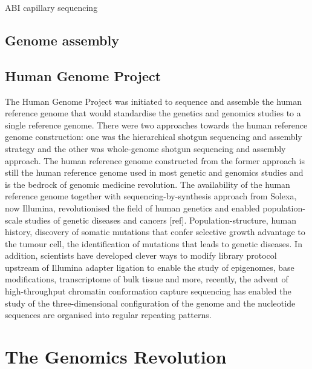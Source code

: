 ABI capillary sequencing

\subsection{Genome assembly}


\subsection{Human Genome Project}


The Human Genome Project was initiated to sequence and assemble the human reference genome that would standardise the genetics and genomics studies to a single reference genome. There were two approaches towards the human reference genome construction: one was the hierarchical shotgun sequencing and assembly strategy and the other was whole-genome shotgun sequencing and assembly approach. The human reference genome constructed from the former approach is still the human reference genome used in most genetic and genomics studies and is the bedrock of genomic medicine revolution\cite{}. The availability of the human reference genome together with sequencing-by-synthesis approach from Solexa, now Illumina, revolutionised the field of human genetics and enabled population-scale studies of genetic diseases and cancers [ref]. Population-structure, human history, discovery of somatic mutations that confer selective growth advantage to the tumour cell, the identification of mutations that leads to genetic diseases. In addition, scientists have developed clever ways to modify library protocol upstream of Illumina adapter ligation to enable the study of epigenomes, base modifications, transcriptome of bulk tissue and more, recently, the advent of high-throughput chromatin conformation capture sequencing has enabled the study of the three-dimensional configuration of the genome and the nucleotide sequences are organised into regular repeating patterns. 


\section{The Genomics Revolution}


